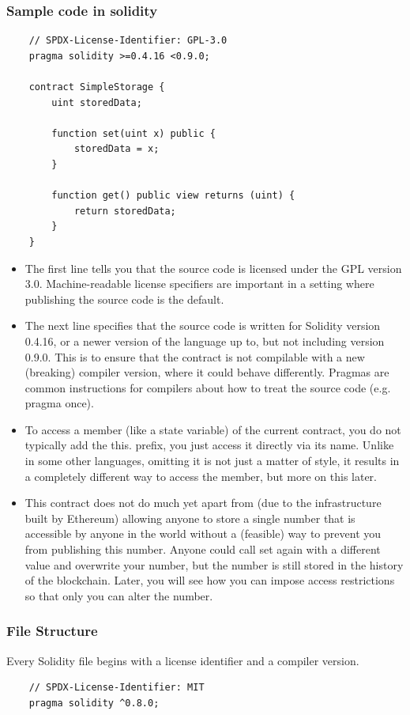 \documentclass[12pt, a4paper]{article}
\begin{document}
\subsubsection{Sample code in solidity}
\begin{verbatim}
    // SPDX-License-Identifier: GPL-3.0
    pragma solidity >=0.4.16 <0.9.0;

    contract SimpleStorage {
        uint storedData;

        function set(uint x) public {
            storedData = x;
        }

        function get() public view returns (uint) {
            return storedData;
        }
    }
\end{verbatim}
\begin{itemize}
    \item The first line tells you that the source code is licensed under the GPL version 3.0. Machine-readable license specifiers are important in a setting where publishing the source code is the default.
    \item The next line specifies that the source code is written for Solidity version 0.4.16, or a newer version of the language up to, but not including version 0.9.0. This is to ensure that the contract is not compilable with a new (breaking) compiler version, where it could behave differently. Pragmas are common instructions for compilers about how to treat the source code (e.g. pragma once).
    \item To access a member (like a state variable) of the current contract, you do not typically add the this. prefix, you just access it directly via its name. Unlike in some other languages, omitting it is not just a matter of style, it results in a completely different way to access the member, but more on this later.
    \item This contract does not do much yet apart from (due to the infrastructure built by Ethereum) allowing anyone to store a single number that is accessible by anyone in the world without a (feasible) way to prevent you from publishing this number. Anyone could call set again with a different value and overwrite your number, but the number is still stored in the history of the blockchain. Later, you will see how you can impose access restrictions so that only you can alter the number.
\end{itemize}
\subsubsection{File Structure}
Every Solidity file begins with a license identifier and a compiler version.
\begin{verbatim}
    // SPDX-License-Identifier: MIT
    pragma solidity ^0.8.0;
\end{verbatim}
\end{document}
